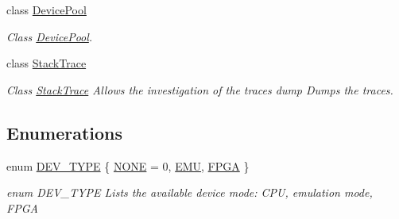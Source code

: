 \begin{DoxyCompactItemize}
class \hyperlink{classintel_1_1hexl_1_1fpga_1_1DevicePool}{Device\-Pool}
\begin{DoxyCompactList}\small\item\em Class \hyperlink{classintel_1_1hexl_1_1fpga_1_1DevicePool}{Device\-Pool}. \end{DoxyCompactList}\item 
class \hyperlink{classintel_1_1hexl_1_1fpga_1_1StackTrace}{Stack\-Trace}
\begin{DoxyCompactList}\small\item\em Class \hyperlink{classintel_1_1hexl_1_1fpga_1_1StackTrace}{Stack\-Trace} Allows the investigation of the traces  dump Dumps the traces. \end{DoxyCompactList}\end{DoxyCompactItemize}
\subsection*{Enumerations}
\begin{DoxyCompactItemize}
\item 
enum \hyperlink{namespaceintel_1_1hexl_1_1fpga_a1a264f07facc5f24376170ea052e4fbc}{D\-E\-V\-\_\-\-T\-Y\-P\-E} \{ \hyperlink{namespaceintel_1_1hexl_1_1fpga_a1a264f07facc5f24376170ea052e4fbca665be2b62dd76ce44231d0503e468464}{N\-O\-N\-E} = 0, 
\hyperlink{namespaceintel_1_1hexl_1_1fpga_a1a264f07facc5f24376170ea052e4fbca6553acb72b13a76b0cf31197badbc164}{E\-M\-U}, 
\hyperlink{namespaceintel_1_1hexl_1_1fpga_a1a264f07facc5f24376170ea052e4fbca7fef8fda7839a871ec648c0283640975}{F\-P\-G\-A}
 \}
\begin{DoxyCompactList}\small\item\em enum D\-E\-V\-\_\-\-T\-Y\-P\-E Lists the available device mode\-: C\-P\-U, emulation mode, F\-P\-G\-A \end{DoxyCompactList}\end{DoxyCompactItemize}
